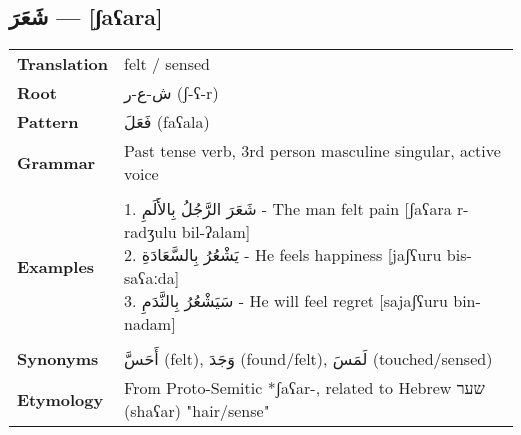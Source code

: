 \documentclass[letterpaper,12pt]{article}
\begin{document}
\subsection{\textarabic{شَعَرَ} — [ʃaʕara]}
\begin{tabular}{p{3cm}p{10cm}}
\toprule
\textbf{Translation} & felt / sensed \\
\textbf{Root} & \textarabic{ش-ع-ر} (ʃ-ʕ-r) \\
\textbf{Pattern} & \textarabic{فَعَلَ} (faʕala) \\
\textbf{Grammar} & Past tense verb, 3rd person masculine singular, active voice \\
\midrule \\
\textbf{Examples} & \makecell[l]{\parbox{9.5cm}{
1. \textarabic{شَعَرَ الرَّجُلُ بِالأَلَمِ} - The man felt pain [ʃaʕara r-radʒulu bil-ʔalam]\\
2. \textarabic{يَشْعُرُ بِالسَّعَادَةِ} - He feels happiness [jaʃʕuru bis-saʕaːda]\\
3. \textarabic{سَيَشْعُرُ بِالنَّدَمِ} - He will feel regret [sajaʃʕuru bin-nadam]
}} \\
\midrule \\
\textbf{Synonyms} & \textarabic{أَحَسَّ} (felt), \textarabic{وَجَدَ} (found/felt), \textarabic{لَمَسَ} (touched/sensed) \\
\textbf{Etymology} & From Proto-Semitic *ʃaʕar-, related to Hebrew \texthebrew{שער} (shaʕar) "hair/sense" \\
\bottomrule
\end{tabular}
\end{document}
